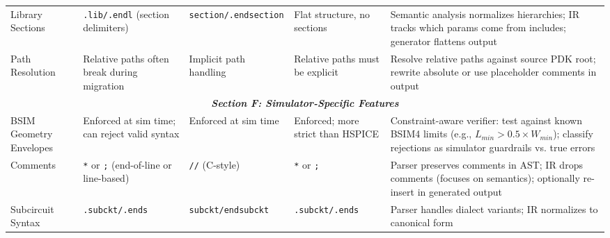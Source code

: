 \begin{table}[!t]
\begin{tabular}{@{}p{2.2cm}p{2.8cm}p{2.8cm}p{2.8cm}p{3.8cm}@{}}
Library Sections & \texttt{.lib/.endl} (section delimiters) & \texttt{section/.endsection} & Flat structure, no sections & Semantic analysis normalizes hierarchies; IR tracks which params come from includes; generator flattens output \\

Path Resolution & Relative paths often break during migration & Implicit path handling & Relative paths must be explicit & Resolve relative paths against source PDK root; rewrite absolute or use placeholder comments in output \\

\midrule
\multicolumn{5}{c}{\textit{\textbf{Section F: Simulator-Specific Features}}} \\
\midrule

BSIM Geometry Envelopes & Enforced at sim time; can reject valid syntax & Enforced at sim time & Enforced; more strict than HSPICE & Constraint-aware verifier: test against known BSIM4 limits (e.g., $L_{min} > 0.5 \times W_{min}$); classify rejections as simulator guardrails vs. true errors \\

Comments & \texttt{*} or \texttt{;} (end-of-line or line-based) & \texttt{//} (C-style) & \texttt{*} or \texttt{;} & Parser preserves comments in AST; IR drops comments (focuses on semantics); optionally re-insert in generated output \\

Subcircuit Syntax & \texttt{.subckt/.ends} & \texttt{subckt/endsubckt} & \texttt{.subckt/.ends} & Parser handles dialect variants; IR normalizes to canonical form \\

\bottomrule
\end{tabular}
\end{table}
